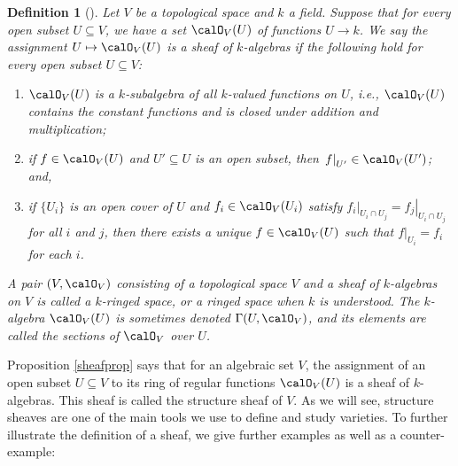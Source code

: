 \documentclass[12pt]{amsart}
\theoremstyle{plain}
\newtheorem{definition}[theorem]{Definition}
\theoremstyle{definition}
\begin{document}
\begin{definition}[{\cite[Chapter 3, a.]{Milne13}}]\label{sheafdef}
Let $V$ be a topological space and $k$ a field.
Suppose that for every open subset $U \subseteq V$, we have a set $\calO_V(U)$ of functions $U \to k$.
We say the assignment $U \mapsto \calO_V(U)$ is a sheaf of $k$-algebras if the following hold for every open subset $U \subseteq V$:
\begin{enumerate}
\item
$\calO_V(U)$ is a $k$-subalgebra of all $k$-valued functions on $U$, i.e., $\calO_V(U)$ contains the constant functions and is closed under addition and multiplication;
\item
if $f \in \calO_V(U)$ and $U'\subseteq U$ is an open subset, then $\left. f \right|_{U'} \in \calO_V(U')$; and,
\item
if $\{U_i\}$ is an open cover of $U$ and $f_i \in \calO_V(U_i)$ satisfy $\left. f_i \right|_{U_i \cap U_j} = \left. f_j \right|_{U_i \cap U_j}$ for all $i$ and $j$, then there exists a unique $f \in \calO_V(U)$ such that $\left. f\right|_{U_i} = f_i$ for each $i$.
\end{enumerate}
A pair $(V, \calO_V)$ consisting of a topological space $V$ and a sheaf of $k$-algebras on $V$ is called a $k$-ringed space, or a ringed space when $k$ is understood.
The $k$-algebra $\calO_V(U)$ is sometimes denoted $\Gamma(U, \calO_V)$, and its elements are called the sections of $\calO_V$ over $U$.
\end{definition}

Proposition \ref{sheafprop} says that for an algebraic set $V$, the assignment of an open subset $U \subseteq V$ to its ring of regular functions $\calO_V(U)$ is a sheaf of $k$-algebras.
This sheaf is called the structure sheaf of $V$.
As we will see, structure sheaves are one of the main tools we use to define and study varieties.
To further illustrate the definition of a sheaf, we give further examples as well as a counter-example:
\end{document}
